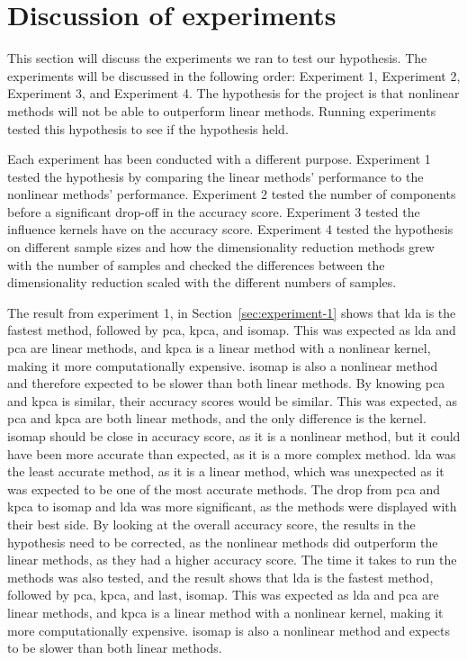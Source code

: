 \section{Discussion of experiments} \label{sec:experiments}
This section will discuss the experiments we ran to test our hypothesis. The experiments will be discussed in the following order: Experiment 1, Experiment 2, Experiment 3, and Experiment 4. The hypothesis for the project is that nonlinear methods will not be able to outperform linear methods. Running experiments tested this hypothesis to see if the hypothesis held. 

Each experiment has been conducted with a different purpose. Experiment 1 tested the hypothesis by comparing the linear methods' performance to the nonlinear methods' performance. Experiment 2 tested the number of components before a significant drop-off in the accuracy score. Experiment 3 tested the influence kernels have on the accuracy score. Experiment 4 tested the hypothesis on different sample sizes and how the dimensionality reduction methods grew with the number of samples and checked the differences between the dimensionality reduction scaled with the different numbers of samples.

The result from experiment 1, in Section~\ref{sec:experiment-1} shows that \gls{lda} is the fastest method, followed by \gls{pca}, \gls{kpca}, and \gls{isomap}. This was expected as \gls{lda} and \gls{pca} are linear methods, and \gls{kpca} is a linear method with a nonlinear kernel, making it more computationally expensive. \gls{isomap} is also a nonlinear method and therefore expected to be slower than both linear methods. By knowing \gls{pca} and \gls{kpca} is similar, their accuracy scores would be similar. This was expected, as \gls{pca} and \gls{kpca} are both linear methods, and the only difference is the kernel. \gls{isomap} should be close in accuracy score, as it is a nonlinear method, but it could have been more accurate than expected, as it is a more complex method. \gls{lda} was the least accurate method, as it is a linear method, which was unexpected as it was expected to be one of the most accurate methods. The drop from \gls{pca} and \gls{kpca} to \gls{isomap} and \gls{lda} was more significant, as the methods were displayed with their best side. By looking at the overall accuracy score, the results in the hypothesis need to be corrected, as the nonlinear methods did outperform the linear methods, as they had a higher accuracy score. The time it takes to run the methods was also tested, and the result shows that \gls{lda} is the fastest method, followed by \gls{pca}, \gls{kpca}, and last, \gls{isomap}. This was expected as \gls{lda} and \gls{pca} are linear methods, and \gls{kpca} is a linear method with a nonlinear kernel, making it more computationally expensive. \gls{isomap} is also a nonlinear method and expects to be slower than both linear methods.

